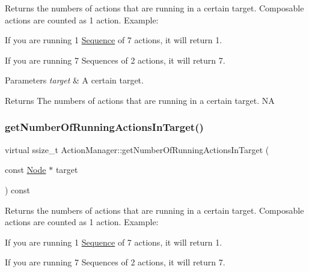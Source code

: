 Returns the numbers of actions that are running in a certain target. Composable actions are counted as 1 action. Example\+:
\begin{DoxyItemize}
\item If you are running 1 \hyperlink{classSequence}{Sequence} of 7 actions, it will return 1.
\item If you are running 7 Sequences of 2 actions, it will return 7.
\end{DoxyItemize}


\begin{DoxyParams}{Parameters}
{\em target} & A certain target. \\
\hline
\end{DoxyParams}
\begin{DoxyReturn}{Returns}
The numbers of actions that are running in a certain target.  NA 
\end{DoxyReturn}
\mbox{\label{classActionManager_a015a2782952a9f649a0cd4d454e82839}} 
\subsubsection{\texorpdfstring{get\+Number\+Of\+Running\+Actions\+In\+Target()}{getNumberOfRunningActionsInTarget()}\hspace{0.1cm}{\footnotesize\ttfamily [2/2]}}
{\footnotesize\ttfamily virtual ssize\+\_\+t Action\+Manager\+::get\+Number\+Of\+Running\+Actions\+In\+Target (\begin{DoxyParamCaption}\item[{const \hyperlink{classNode}{Node} $\ast$}]{target }\end{DoxyParamCaption}) const\hspace{0.3cm}{\ttfamily [virtual]}}

Returns the numbers of actions that are running in a certain target. Composable actions are counted as 1 action. Example\+:
\begin{DoxyItemize}
\item If you are running 1 \hyperlink{classSequence}{Sequence} of 7 actions, it will return 1.
\item If you are running 7 Sequences of 2 actions, it will return 7.
\end{DoxyItemize}


